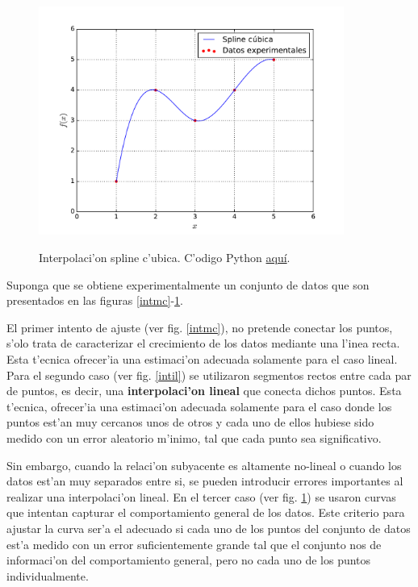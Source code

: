 \documentclass[letterpaper,11pt]{report}
\begin{document}
\begin{figure}[h!]
\begin{center}
\includegraphics[width=10cm]{figs/fig-int-curv.pdf}\label{intic}
\caption{Interpolaci'on spline c'ubica. C'odigo Python  \href{https://github.com/gfrubi/Lab/blob/master/python/fig-int-curv.py}{aqu\'i}.}
\end{center}
\end{figure}

Suponga que se obtiene experimentalmente un conjunto de datos que son presentados en las figuras \ref{intmc}-\ref{intic}.

El primer intento de ajuste (ver fig. \ref{intmc}), no pretende conectar los puntos, s'olo trata de caracterizar el crecimiento de los datos mediante una l'inea recta. Esta t'ecnica ofrecer'ia una estimaci'on adecuada solamente para el caso lineal. Para el segundo caso (ver fig. \ref{intil}) se utilizaron segmentos rectos entre cada par de puntos, es decir, una \textbf{interpolaci'on lineal} que conecta dichos puntos.  Esta t'ecnica, ofrecer'ia una estimaci'on adecuada solamente para el caso donde los puntos est'an muy cercanos unos de otros y cada uno de ellos hubiese sido medido con un error aleatorio m'inimo, tal que cada punto sea significativo.

Sin embargo, cuando la relaci'on subyacente es altamente no-lineal o cuando los datos est'an muy separados entre si, se pueden introducir errores importantes al realizar una interpolaci'on lineal. En el tercer caso (ver fig. \ref{intic}) se usaron curvas que intentan capturar el comportamiento general de los datos. Este criterio para ajustar la curva ser'a el adecuado si cada uno de los puntos del conjunto de datos est'a medido con un error suficientemente grande tal que el conjunto nos de informaci'on del comportamiento general, pero no cada uno de los puntos individualmente.
\end{document}
